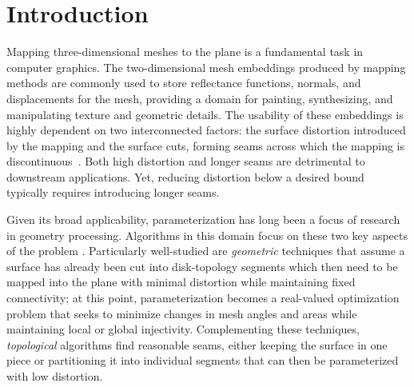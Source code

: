 
\section{Introduction}
Mapping three-dimensional meshes to the plane is a fundamental task in computer graphics.  The two-dimensional mesh embeddings produced by mapping methods are commonly used to store reflectance functions, normals, and displacements
for the mesh, providing a domain for painting, synthesizing, and manipulating texture and geometric details. 
%
The usability of these embeddings is highly dependent on two interconnected factors: the surface distortion introduced by the mapping and the   surface cuts, forming seams across which the mapping is discontinuous~\cite{Hormann2008}. Both high distortion and longer seams are detrimental to downstream applications.
Yet, reducing distortion below a desired 
bound typically requires introducing longer seams. 

Given its broad applicability, parameterization has long been a focus of research in geometry processing. Algorithms in this domain focus on these two key aspects of the problem \cite{Sheffer07_ParameterizationSurvey}.  Particularly well-studied are \emph{geometric} techniques that assume a surface has already been cut into disk-topology segments which then need to be mapped into the plane with minimal distortion while maintaining fixed connectivity; at this point, parameterization becomes a real-valued optimization problem that seeks to minimize changes in mesh angles and areas while maintaining local or global injectivity. Complementing these techniques, \emph{topological} algorithms find reasonable seams, either keeping the surface in one piece or partitioning it into individual segments that can then be parameterized with low distortion. %


